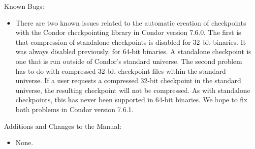 \noindent Known Bugs:

\begin{itemize}

\item There are two known issues related to the automatic creation
of checkpoints with the Condor checkpointing library in 
Condor version 7.6.0.
The first is that compression of
standalone checkpoints is disabled for 32-bit binaries.
It was always disabled previously, for 64-bit binaries.
A standalone checkpoint is one that is run outside
of Condor's standard universe.  The second problem has to do with compressed
32-bit checkpoint files within the standard universe.
If a user requests a compressed 32-bit checkpoint in the standard universe,
the resulting checkpoint will not be compressed.
As with standalone checkpoints, this has never been supported
in 64-bit binaries.  We hope to fix both problems in 
Condor version 7.6.1.

\end{itemize}

\noindent Additions and Changes to the Manual:

\begin{itemize}

\item None.

\end{itemize}

